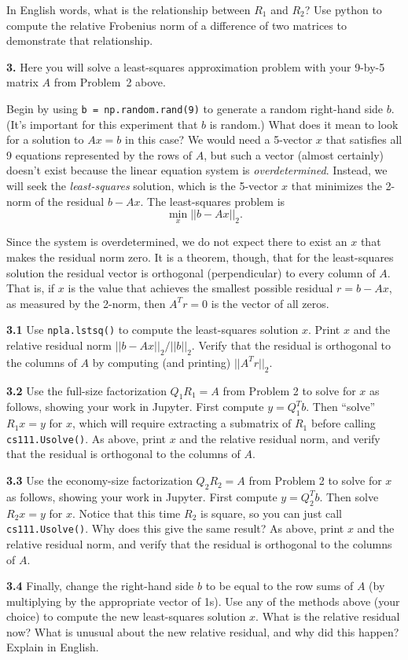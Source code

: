 \documentclass[11pt]{article}
\begin{document}
In English words, what is the relationship between $R_1$ and $R_2$?  
Use python to compute the relative Frobenius norm of a difference of
two matrices to demonstrate that relationship.

\par\bigskip
{\bf 3.}
Here you will solve a least-squares approximation problem with 
your 9-by-5 matrix $A$ from Problem~2 above.

Begin by using {\tt b = np.random.rand(9)} to generate a random
right-hand side $b$. 
(It's important for this experiment that $b$ is random.)
What does it mean to look for a solution to $Ax=b$ in this case?
We would need a 5-vector $x$ that satisfies all 9 equations 
represented by the rows of $A$, 
but such a vector (almost certainly) doesn't exist because the
linear equation system is {\em overdetermined}.
Instead, we will seek the {\em least-squares} solution, 
which is the 5-vector $x$ that minimizes the 2-norm of the 
residual $b-Ax$.
The least-squares problem is
$$\min_x||b-Ax||_2.$$

Since the system is overdetermined, 
we do not expect there to exist an $x$ that makes the residual norm zero.
It is a theorem, though, that for the least-squares solution the residual vector
is orthogonal (perpendicular) to every column of $A$. 
That is, if $x$ is the value that achieves the smallest possible 
residual $r = b - Ax$, as measured by the 2-norm,
then $A^Tr=0$ is the vector of all zeros.

\par\medskip
{\bf 3.1}
Use {\tt npla.lstsq()} to compute the least-squares solution $x$. 
Print $x$ and the relative residual norm $||b-Ax||_2/||b||_2$.
Verify that the residual is orthogonal to the columns of $A$ by 
computing (and printing) $||A^Tr||_2$.

\par\medskip
{\bf 3.2}
Use the full-size factorization $Q_1R_1=A$ from Problem 2 to solve for $x$ 
as follows, showing your work in Jupyter.
First compute $y = Q_1^Tb$. 
Then ``solve'' $R_1x=y$ for $x$,
which will require extracting a submatrix of $R_1$ before calling 
{\tt cs111.Usolve()}.
As above, print $x$ and the relative residual norm, 
and verify that the residual is orthogonal to the columns of $A$.

\par\medskip
{\bf 3.3}
Use the economy-size factorization $Q_2R_2=A$ from Problem 2 to solve for $x$ 
as follows, showing your work in Jupyter.
First compute $y = Q_2^Tb$. 
Then solve $R_2x=y$ for $x$.
Notice that this time $R_2$ is square, so you can just call
{\tt cs111.Usolve()}.
Why does this give the same result?
As above, print $x$ and the relative residual norm, 
and verify that the residual is orthogonal to the columns of $A$.

\par\medskip
{\bf 3.4}
Finally, change the right-hand side $b$ to be equal to the row sums
of $A$ (by multiplying by the appropriate vector of 1s).
Use any of the methods above (your choice) to compute the new
least-squares solution $x$. What is the relative residual now?
What is unusual about the new relative residual, and why did this happen?
Explain in English.
\end{document}
